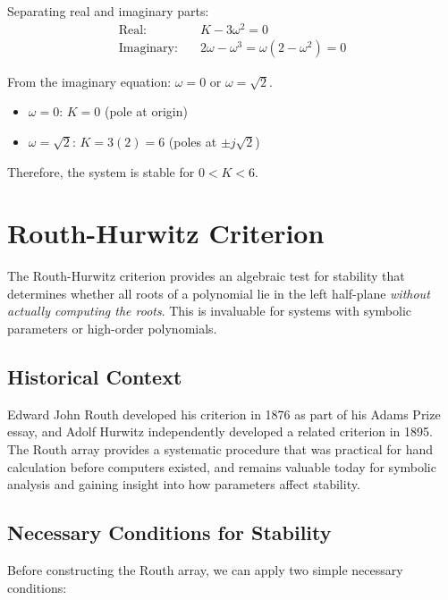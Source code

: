 Separating real and imaginary parts:
\begin{align}
\text{Real:} \quad & K - 3\omega^2 = 0 \\
\text{Imaginary:} \quad & 2\omega - \omega^3 = \omega(2 - \omega^2) = 0
\end{align}

From the imaginary equation: $\omega = 0$ or $\omega = \sqrt{2}$.

\begin{itemize}
    \item $\omega = 0$: $K = 0$ (pole at origin)
    \item $\omega = \sqrt{2}$: $K = 3(2) = 6$ (poles at $\pm j\sqrt{2}$)
\end{itemize}

Therefore, the system is stable for $0 < K < 6$.

\section{Routh-Hurwitz Criterion}
\label{sec:routh_hurwitz}

The Routh-Hurwitz criterion provides an algebraic test for stability that determines whether all roots of a polynomial lie in the left half-plane \textit{without actually computing the roots}. This is invaluable for systems with symbolic parameters or high-order polynomials.

\subsection{Historical Context}

Edward John Routh developed his criterion in 1876 as part of his Adams Prize essay, and Adolf Hurwitz independently developed a related criterion in 1895. The Routh array provides a systematic procedure that was practical for hand calculation before computers existed, and remains valuable today for symbolic analysis and gaining insight into how parameters affect stability.

\subsection{Necessary Conditions for Stability}

Before constructing the Routh array, we can apply two simple necessary conditions:

